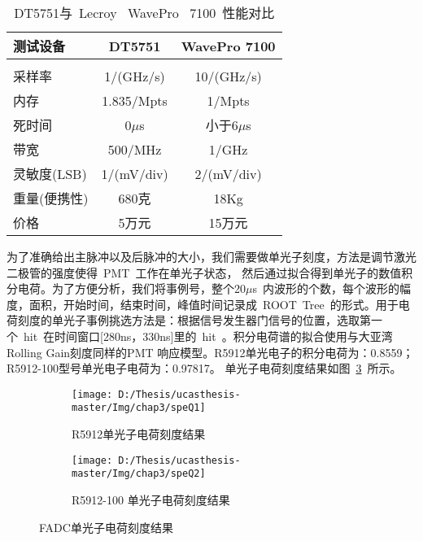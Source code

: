 \begin{table}[htbp]
\centering  %
\begin{tabular}{lcc}  %
\hline
测试设备 &DT5751 &WavePro 7100 \\ \hline
\\  采样率&1/(GHz/s) &10/(GHz/s)
\\  内存 &1.835/Mpts &1/Mpts
\\  死时间& 0$\mu$s &小于6$\mu$s
\\   带宽 &500/MHz &1/GHz
\\   灵敏度(LSB)&1/(mV/div)& 2/(mV/div)
\\  重量(便携性)& 680克 & 18Kg
\\ 价格& 5万元& 15万元
\\ \hline
\end{tabular}
\caption{DT5751与~Lecroy~ WavePro ~7100~性能对比}
\label{tab:dtwa}
\end{table}
为了准确给出主脉冲以及后脉冲的大小，我们需要做单光子刻度，方法是调节激光二极管的强度使得~PMT~工作在单光子状态， 然后通过拟合得到单光子的数值积分电荷。为了方便分析，我们将事例号，整个20$\mu$s~内波形的个数，每个波形的幅度，面积，开始时间，结束时间，峰值时间记录成~ROOT~Tree~的形式。用于电荷刻度的单光子事例挑选方法是：根据信号发生器门信号的位置，选取第一个~hit~在时间窗口[280ns，330ns]里的~hit~。积分电荷谱的拟合使用与大亚湾Rolling Gain刻度同样的PMT 响应模型。R5912单光电子的积分电荷为：0.8559；R5912-100型号单光电子电荷为：0.97817。 单光子电荷刻度结果如图~\ref{fig:speQ}~所示。
\begin{figure}[!htb]
  \centering
  \begin{subfigure}[b]{\MySubFactor\textwidth}
    \texttt{[image: D:/Thesis/ucasthesis-master/Img/chap3/speQ1]}
    \caption{R5912单光子电荷刻度结果}
    \label{fig:speQ_1}
  \end{subfigure}%
  \quad\quad\quad\quad%
  \begin{subfigure}[b]{\MySubFactor\textwidth}
    \texttt{[image: D:/Thesis/ucasthesis-master/Img/chap3/speQ2]}
    \caption{R5912-100 单光子电荷刻度结果}
    \label{fig:speQ_2}
  \end{subfigure}
  \caption{FADC单光子电荷刻度结果}
  \label{fig:speQ}
\end{figure}

